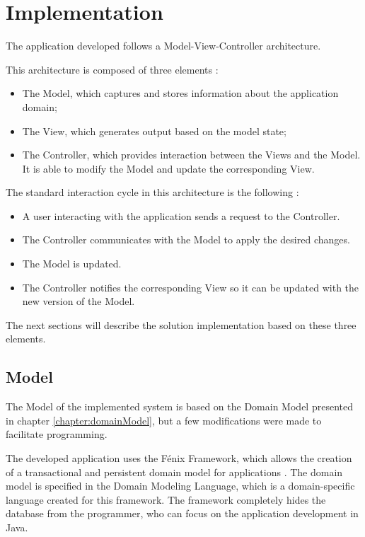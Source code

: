 
\chapter{Implementation}
\label{chapter:implementation}

The application developed follows a Model-View-Controller architecture.

This architecture is composed of three elements \cite{krasner1988description}:
\begin{itemize}
\item The Model, which captures and stores information about the application domain;
\item The View, which generates output based on the model state;
\item The Controller, which provides interaction between the Views and the Model. It is able to modify the Model and update the corresponding View.
\end{itemize}

The standard interaction cycle in this architecture is the following \cite{krasner1988description,reenskaug2009dci}:
\begin{itemize}
\item A user interacting with the application sends a request to the Controller.

\item The Controller communicates with the Model to apply the desired changes.

\item The Model is updated.

\item The Controller notifies the corresponding View so it can be updated with the new version of the Model.
\end{itemize}

The next sections will describe the solution implementation based on these three elements.


\section{Model}
\label{section:model}
The Model of the implemented system is based on the Domain Model presented in chapter \ref{chapter:domainModel}, but a few modifications were made to facilitate programming.

The developed application uses the F\'{e}nix Framework, which allows the creation of a transactional and persistent domain model for applications \cite{cachopo2006combining,cachopo2007development}. The domain model is specified in the Domain Modeling Language, which is a domain-specific language created for this framework. The framework completely hides the database from the programmer, who can focus on the application development in Java. 

